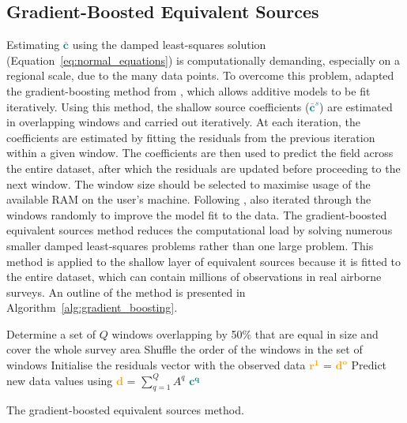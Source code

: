 \subsection{Gradient-Boosted Equivalent Sources}
\label{sec:gradient-boosting}

Estimating \textcolor{teal}{$\bar{\mathbf{c}}$} using the damped least-squares solution (Equation~\ref{eq:normal_equations}) is computationally demanding, especially on a regional scale, due to the many data points. To overcome this problem, \citet{Soler2021} adapted the gradient-boosting method from \citet{Friedman2001}, which allows additive models to be fit iteratively. Using this method, the shallow source coefficients (\textcolor{teal}{$\bar{\mathbf{c}}^s$}) are estimated in overlapping windows and carried out iteratively. At each iteration, the coefficients are estimated by fitting the residuals from the previous iteration within a given window. The coefficients are then used to predict the field across the entire dataset, after which the residuals are updated before proceeding to the next window. The window size should be selected to maximise usage of the available RAM on the user's machine. Following \citet{Friedman2002}, \citet{Soler2021} also iterated through the windows randomly to improve the model fit to the data. The gradient-boosted equivalent sources method reduces the computational load by solving numerous smaller damped least-squares problems rather than one large problem. This method is applied to the shallow layer of equivalent sources because it is fitted to the entire dataset, which can contain millions of observations in real airborne surveys. An outline of the method is presented in Algorithm~\ref{alg:gradient_boosting}.

\begin{algorithm}[!h]
    Determine a set of $Q$ windows overlapping by 50\% that are equal in size and cover the whole survey area
    \;
    Shuffle the order of the windows in the set of windows
    \;
    Initialise the residuals vector with the observed data \textcolor{orange}{$\mathbf{r^1}$} = \textcolor{orange}{$\mathbf{d^o}$}
    \;
    Predict new data values using \textcolor{orange}{$\mathbf{d}$} = $\sum\limits_{q=1}^{Q} A^q$ \textcolor{teal}{$\mathbf{c^q}$}
    \;
    \BlankLine
    \caption{The gradient-boosted equivalent sources method.}
    \label{alg:gradient_boosting}
\end{algorithm}

